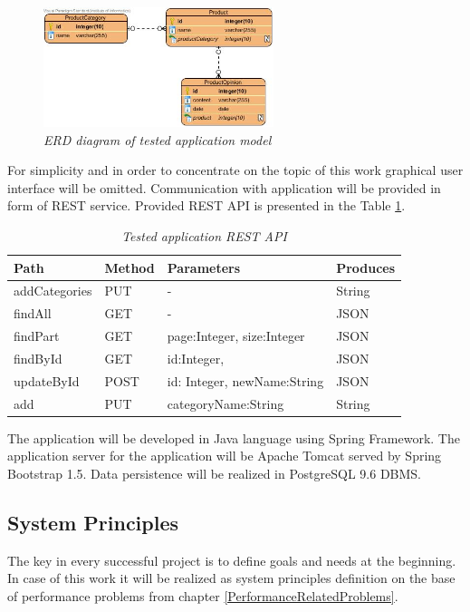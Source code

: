 \documentclass[10pt,a4paper]{article}
\begin{document}
\begin{figure}[h]
\centering
\includegraphics[width=0.6\textwidth]{erd}
\caption{\textit{ERD diagram of tested application model}}
\label{erd}
\end{figure}

For simplicity and in order to concentrate on the topic of this work graphical user interface will be omitted. Communication with application will be provided in form of REST service. Provided REST API is presented in the Table \ref{restapi}.

\begin{table}[!htb]
\def\arraystretch{1.5}
\caption{\textit{Tested application REST API}}\label{restapi}
\begin{tabularx}{\textwidth}{p{2cm}|p{1.2cm}|X|p{2cm}}
  \textbf{Path} &\textbf{Method} & \textbf{Parameters} & \textbf{Produces} \\
  \hline
  addCategories & PUT & - & String \\ 
  findAll & GET & - & JSON\\
  findPart & GET & page:Integer, size:Integer & JSON\\
  findById & GET & id:Integer, & JSON \\
  updateById & POST & id: Integer, newName:String & JSON \\
  add & PUT & categoryName:String & String\\
\end{tabularx}
\end{table}


The application will be developed in Java language using Spring Framework. The application server for the application will be Apache Tomcat served by Spring Bootstrap 1.5. Data persistence will be realized in PostgreSQL 9.6 DBMS.  

\subsection{System Principles}
The key in every successful project is to define goals and needs at the beginning.
In case of this work it will be realized as system principles definition on the base of  performance problems from chapter \ref{PerformanceRelatedProblems}.
\end{document}
